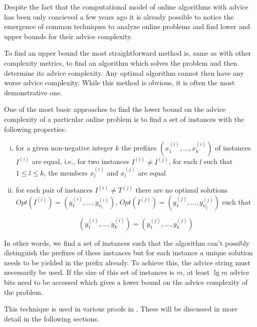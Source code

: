 Despite the fact that the computational model of online algorithms with
advice has been only concieved a few years ago it is already possible to
notice the emergence of common techniques to analyze online problems and
find lower and upper bounds for their advice complexity.

To find an upper bound the most straightforward method is, same as with
other complexity metrics, to find an algorithm which solves the problem
and then determine its advice complexity. Any optimal algorithm cannot
then have any worse advice complexity. While this method is obvious, it is
often the most demonstrative one.

One of the most basic approaches to find the lower bound on the advice
complexity of a particular online problem is to find a set of instances
with the following properties:

\begin{enumerate}[(i)]
    \item
    for a given non-negative integer $k$ the prefixes $(x_1^{(i)}, \dots,
    x_k^{(i)})$ of instances $I^{(i)}$ are equal, i.e., for two instances
    $I^{(i)} \not= I^{(j)}$, for each $l$ such that $1 \leq l \leq k$,
    the members $x_l^{(i)}$ and $x_l^{(j)}$ are equal

    \item
    for each pair of instances $I^{(i)} \not= T^{(j)}$ there are no
    optimal solutions $Opt(I^{(i)}) = (y_1^{(i)}, \dots, y_{n_i}^{(i)})$,
    $Opt(I^{(j)}) = (y_1^{(j)}, \dots, y_{n_j}^{(j)})$ such that

    $$(y_1^{(i)}, \dots, y_{k}^{(i)}) = (y_1^{(j)}, \dots, y_{k}^{(j)})$$
\end{enumerate}

In other words, we find a set of instances such that the algorithm can't
possibly distinguish the prefixes of these instances but for each instance
a unique solution needs to be yielded in the prefix already. To achieve
this, the advice string must necessarily be used. If the size of this set
of instances is $m$, at least $\lg m$ advice bits need to be accessed
which gives a lower bound on the advice complexity of the problem.

This technique is used in various proofs in \cite{misof-trivial-graphs}.
These will be discussed in more detail in the following sections.
